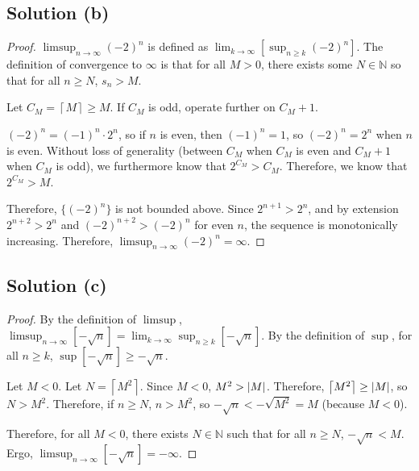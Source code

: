 \documentclass[11pt]{article}
\begin{document}
    \subsection{Solution (b)}
        \begin{proof}
            $\limsup_{n \to \infty} (-2)^n$ is defined as $\lim_{k \to \infty} \left[ \sup_{n \geq k} (-2)^n \right]$.
            The definition of convergence to $\infty$ is that for all $M > 0$, there exists some $N \in \mathbb{N}$ so that for all $n \geq N$, $s_n > M$.

            Let $C_M = \left\lceil M \right\rceil \geq M$.
            If $C_M$ is odd, operate further on $C_M + 1$.
            
            $(-2)^n = (-1)^n \cdot 2^n$, so if $n$ is even, then $(-1)^n = 1$, so $(-2)^n = 2^n$ when $n$ is even.
            Without loss of generality (between $C_M$ when $C_M$ is even and $C_M + 1$ when $C_M$ is odd), we furthermore know that $2^{C_M} > C_M$.
            Therefore, we know that $2^{C_M} > M$.

            Therefore, $\{(-2)^n\}$ is not bounded above.
            Since $2^{n + 1} > 2^n$, and by extension $2^{n + 2} > 2^n$ and $(-2)^{n + 2} > (-2)^n$ for even $n$, the sequence is monotonically increasing.
            Therefore, $\limsup_{n \to \infty} (-2)^n = \infty$.
        \end{proof}
    \subsection{Solution (c)}
        \begin{proof}
            By the definition of $\limsup$, $\limsup_{n \to \infty} \left[-\sqrt{n}\right] = \lim_{k \to \infty} \sup_{n \geq k} \left[-\sqrt{n}\right]$.
            By the definition of $\sup$, for all $n \geq k$, $\sup \left[-\sqrt{n}\right] \geq -\sqrt{n}$.

            Let $M < 0$.
            Let $N = \left\lceil M^2 \right\rceil$.
            Since $M < 0$, $M^2 > \left| M \right|$.
            Therefore, $\left\lceil M^2 \right\rceil \geq \left| M \right|$, so $N > M^2$.
            Therefore, if $n \geq N$, $n > M^2$, so $-\sqrt{n} < -\sqrt{M^2} = M$ (because $M < 0$).

            Therefore, for all $M < 0$, there exists $N \in \mathbb{N}$ such that for all $n \geq N$, $-\sqrt{n} < M$.
            Ergo, $\limsup_{n \to \infty} \left[-\sqrt{n}\right] = -\infty$.
        \end{proof}
    \pagebreak
\end{document}

